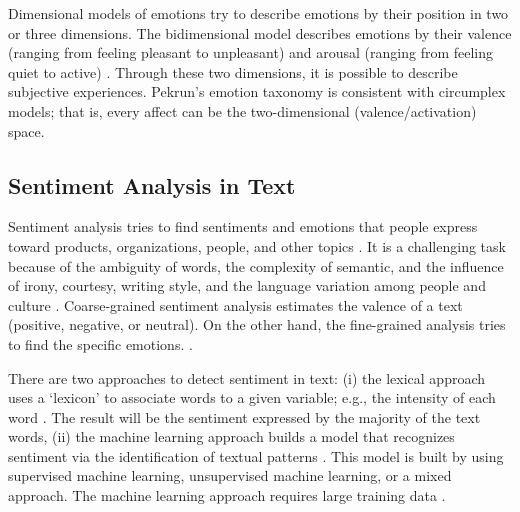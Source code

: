 \documentclass[3p,times,preprint]{elsarticle}
\begin{document}
{Dimensional models of emotions try to describe emotions by their position in two or three dimensions. The bidimensional model describes emotions by their valence (ranging from feeling pleasant to unpleasant) and arousal (ranging from feeling quiet to active) \citep{Coppin2013}. Through these two dimensions, it is possible to describe subjective experiences. Pekrun’s emotion taxonomy \citep{Pekrun2011} is consistent with circumplex models; that is, every affect can be the two-dimensional  (valence/activation) space. %


\subsection{Sentiment Analysis in Text}
Sentiment analysis tries to find  sentiments and emotions that people express toward products, organizations, people, and other topics \citep{Appel2016,Keshavarz2017,Sanglerdsinlapachai2014}. It is a challenging task because of the ambiguity of words, the complexity of semantic, and the influence of irony, courtesy, writing style, and the language variation among people and culture  \citep{Poria2014}. %
Coarse-grained sentiment analysis estimates the valence of a text (positive, negative, or neutral). On the other hand, the fine-grained analysis tries to find the specific emotions. \citep{Giatsoglou2017}. 

 
There are two approaches to detect sentiment in text: (i) the lexical approach uses a ‘lexicon’ to associate words to a given variable; e.g., the intensity of each word \citep{Keshavarz2017}. The result will be the sentiment expressed by the majority of the text words, (ii) the machine learning approach builds a model that recognizes sentiment via the identification of textual patterns \citep{Sanglerdsinlapachai2014}. This model is built by using supervised machine learning, unsupervised machine learning, or a mixed approach. The machine learning approach requires large training data  \citep{Madhoushi2015,Wang2016b}. %


}
\end{document}
